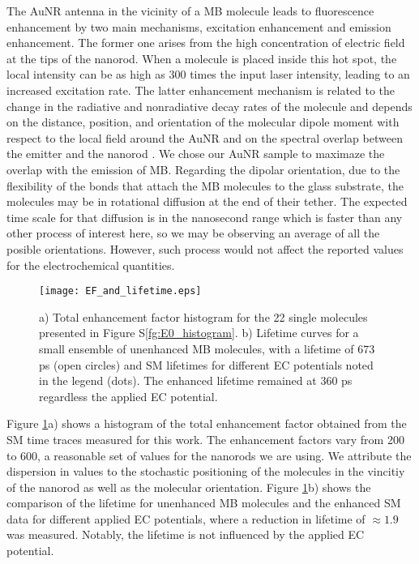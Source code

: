 \documentclass[11pt,a4paper,onecolumn]{article}
\begin{document}
The AuNR antenna in the vicinity of a MB molecule leads to fluorescence enhancement by two main mechanisms, excitation enhancement and emission enhancement. The former one arises from the high concentration of electric field at the tips of the nanorod. When a molecule is placed inside this hot spot, the local intensity can be as high as 300 times the input laser intensity, leading to an increased excitation rate. The latter enhancement mechanism is related to the change in the radiative and nonradiative decay rates of the molecule and depends on the distance, position, and orientation of the molecular dipole moment with respect to the local field around the AuNR and on the spectral overlap between the emitter and the nanorod \cite{khatua2014resonant}. We chose our AuNR sample to maximaze the overlap with the emission of MB. Regarding the dipolar orientation, due to the flexibility of the bonds that attach the MB molecules to the glass substrate, the molecules may be in rotational diffusion at the end of their tether. The expected time scale for that diffusion is in the nanosecond range which is faster than any other process of interest here, so we may be observing an average of all the posible orientations. However, such process would not affect the reported values for the electrochemical quantities.

\begin{figure}
  \centering
  \texttt{[image: EF\_and\_lifetime.eps]}
	\makeatletter
	\renewcommand{\fnum@figure}{\figurename~S\thefigure}
	\makeatother
  \caption{a) Total enhancement factor histogram for the 22 single molecules presented in Figure S\ref{fg:E0_histogram}. b) Lifetime curves for a small ensemble of unenhanced MB molecules, with a lifetime of $673$ ps (open circles) and SM lifetimes for different EC potentials noted in the legend (dots). The enhanced lifetime remained at $360$ ps regardless the applied EC potential.
	}
  \label{fg:EF_and_lifetime}
\end{figure}

Figure \ref{fg:EF_and_lifetime}a) shows a histogram of the total enhancement factor obtained from the SM time traces measured for this work. The enhancement factors vary from 200 to 600, a reasonable set of values for the nanorods we are using. We attribute the dispersion in values to the stochastic positioning of the molecules in the vincitiy of the nanorod as well as the molecular orientation. Figure \ref{fg:EF_and_lifetime}b) shows the comparison of the lifetime for unenhanced MB molecules and the enhanced SM data for different applied EC potentials, where a reduction in lifetime of $\approx 1.9$ was measured. Notably, the lifetime is not influenced by the applied EC potential. 
\end{document}
